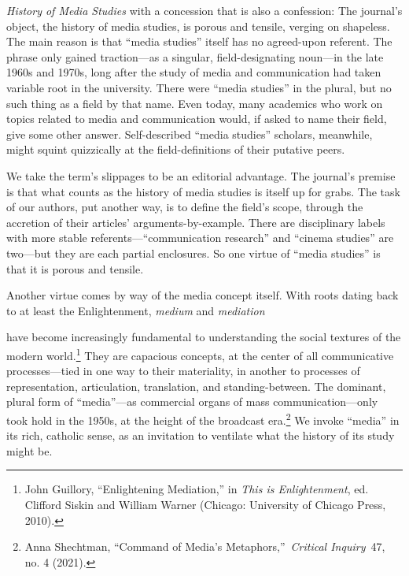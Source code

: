 \documentclass{tufte-handout}
\begin{document}
\begin{titlepage}
\begin{fullwidth}
\end{fullwidth}

\vspace*{1em}


 \emph{History of Media Studies} with a concession that is also
a confession: The journal's object, the history of media studies, is
porous and tensile, verging on shapeless. The main reason is that
``media studies'' itself has no agreed-upon referent. The phrase only
gained traction---as a singular, field-designating noun---in the late
1960s and 1970s, long after the study of media and communication had
taken variable root in the university. There were ``media studies'' in
the plural, but no such thing as a field by that name. Even today, many
academics who work on topics related to media and communication would,
if asked to name their field, give some other answer. Self-described
``media studies'' scholars, meanwhile, might squint quizzically at the
field-definitions of their putative peers.

We take the term's slippages to be an editorial advantage. The journal's
premise is that what counts as the history of media studies is itself up
for grabs. The task of our authors, put another way, is to define the
field's scope, through the accretion of their articles'
arguments-by-example. There are disciplinary labels with more stable
referents---``communication research'' and ``cinema studies'' are
two---but they are each partial enclosures. So one virtue of ``media
studies'' is that it is porous and tensile.

Another virtue comes by way of the media concept itself. With roots
dating back to at least the Enlightenment, \emph{medium} and \emph{mediation}

\enlargethispage{2\baselineskip}

\vspace*{2em}



 \end{titlepage}


\noindent have become increasingly fundamental to understanding
the social textures of the modern
world.\footnote{John Guillory, ``Enlightening Mediation,'' in \emph{This is
  Enlightenment}, ed. \emph{} Clifford Siskin and William Warner
  (Chicago: University of Chicago Press, 2010).
} They are capacious
concepts, at the center of all communicative processes---tied in one way
to their materiality, in another to processes of representation,
articulation, translation, and standing-between. The dominant, plural
form of ``media''---as commercial organs of mass communication---only
took hold in the 1950s, at the height of the broadcast
era.\footnote{Anna Shechtman, ``Command of Media's Metaphors,''~\emph{Critical
  Inquiry}~47, no. 4 (2021).
} We invoke ``media'' in its
rich, catholic sense, as an invitation to ventilate what the history of
its study might be.
\end{document}
